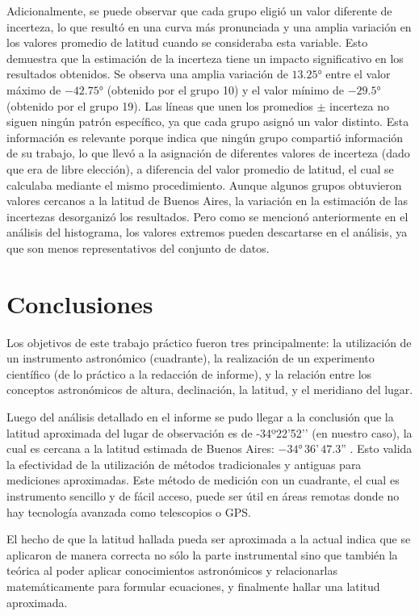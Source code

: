 \documentclass[12pt, a4paper]{article} %
\begin{document}
Adicionalmente, se puede observar que cada grupo eligió un valor diferente de incerteza, lo que resultó en una curva más pronunciada y una amplia variación en los valores promedio de latitud cuando se consideraba esta variable. Esto demuestra que la estimación de la incerteza tiene un impacto significativo en los resultados obtenidos. Se observa una amplia variación de $\ang{13.25}$ entre el valor máximo de $-\ang{42.75}$ (obtenido por el grupo 10) y el valor mínimo de $-\ang{29.5}$ (obtenido por el grupo 19). Las líneas que unen los promedios $\pm$ incerteza no siguen ningún patrón específico, ya que cada grupo asignó un valor distinto. Esta información es relevante porque indica que ningún grupo compartió información de su trabajo, lo que llevó a la asignación de diferentes valores de incerteza (dado que era de libre elección), a diferencia del valor promedio de latitud, el cual se calculaba mediante el mismo procedimiento. Aunque algunos grupos obtuvieron valores cercanos a la latitud de Buenos Aires, la variación en la estimación de las incertezas desorganizó los resultados. Pero como se mencionó anteriormente en el análisis del histograma, los valores extremos pueden descartarse en el análisis, ya que son menos representativos del conjunto de datos.

\section{Conclusiones}
Los objetivos de este trabajo práctico fueron tres principalmente: la utilización de un instrumento astronómico (cuadrante), la realización de un experimento científico (de lo práctico a la redacción de informe), y la relación entre los conceptos astronómicos de altura, declinación, la latitud, y el meridiano del lugar. 

Luego del análisis detallado en el informe se pudo llegar a la conclusión que la latitud aproximada del lugar de observación es de -34º22’52’’ (en nuestro caso), la cual es cercana a la latitud estimada de Buenos Aires: $-\ang{34} \, 36\text{'} \, 47.3\text{''}$ {\cite{geodatosCoordenadasGeogrxE1ficas}}. 
Esto valida la efectividad de la utilización de métodos tradicionales y antiguas para mediciones aproximadas. Este método de medición con un cuadrante, el cual es instrumento sencillo y de fácil acceso, puede ser útil en áreas remotas donde no hay tecnología avanzada como telescopios o GPS. 

El hecho de que la latitud hallada pueda ser aproximada a la actual indica que se aplicaron de manera correcta no sólo la parte instrumental sino que también la teórica al poder aplicar conocimientos astronómicos y relacionarlas matemáticamente para formular ecuaciones, y finalmente hallar una latitud aproximada. 
\end{document}
